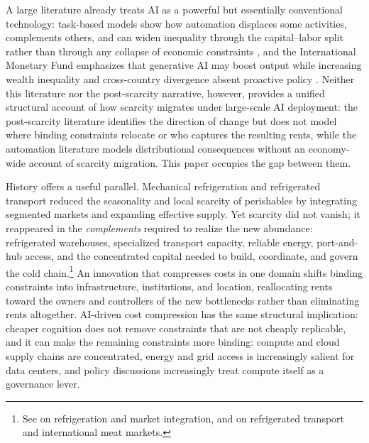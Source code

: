 \documentclass[11pt]{article}
\begin{document}
A large literature already treats AI as a powerful but essentially conventional technology: task-based models show how automation displaces some activities, complements others, and can widen inequality through the capital--labor split rather than through any collapse of economic constraints \citep[e.g.][]{AcemogluRestrepo2018,AcemogluRestrepo2021}, and the International Monetary Fund emphasizes that generative AI may boost output while increasing wealth inequality and cross-country divergence absent proactive policy \citep{IMF2024}. Neither this literature nor the post-scarcity narrative, however, provides a unified structural account of how scarcity migrates under large-scale AI deployment: the post-scarcity literature identifies the direction of change but does not model where binding constraints relocate or who captures the resulting rents, while the automation literature models distributional consequences without an economy-wide account of scarcity migration. This paper occupies the gap between them.

History offers a useful parallel. Mechanical refrigeration and refrigerated transport reduced the seasonality and local scarcity of perishables by integrating segmented markets and expanding effective supply. Yet scarcity did not vanish; it reappeared in the \emph{complements} required to realize the new abundance: refrigerated warehouses, specialized transport capacity, reliable energy, port-and-hub access, and the concentrated capital needed to build, coordinate, and govern the cold chain.\footnote{See \citet{GoodwinGrennesCraig2002} on refrigeration and market integration, and \citet{DelgadoPinillaAparicio2023} on refrigerated transport and international meat markets.} An innovation that compresses costs in one domain shifts binding constraints into infrastructure, institutions, and location, reallocating rents toward the owners and controllers of the new bottlenecks rather than eliminating rents altogether. AI-driven cost compression has the same structural implication: cheaper cognition does not remove constraints that are not cheaply replicable, and it can make the remaining constraints more binding: compute and cloud supply chains are concentrated, energy and grid access is increasingly salient for data centers, and policy discussions increasingly treat compute itself as a governance lever.
\end{document}
